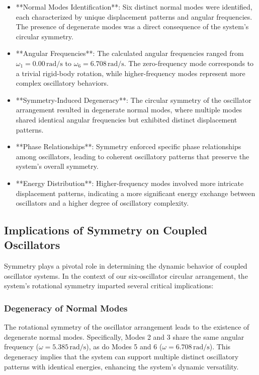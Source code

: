 \documentclass[12pt]{report} %
\begin{document}
\begin{itemize}
    \item **Normal Modes Identification**: Six distinct normal modes were identified, each characterized by unique displacement patterns and angular frequencies. The presence of degenerate modes was a direct consequence of the system's circular symmetry.
    
    \item **Angular Frequencies**: The calculated angular frequencies ranged from \( \omega_1 = 0.00 \, \text{rad/s} \) to \( \omega_6 = 6.708 \, \text{rad/s} \). The zero-frequency mode corresponds to a trivial rigid-body rotation, while higher-frequency modes represent more complex oscillatory behaviors.
    
    \item **Symmetry-Induced Degeneracy**: The circular symmetry of the oscillator arrangement resulted in degenerate normal modes, where multiple modes shared identical angular frequencies but exhibited distinct displacement patterns.
    
    \item **Phase Relationships**: Symmetry enforced specific phase relationships among oscillators, leading to coherent oscillatory patterns that preserve the system's overall symmetry.
    
    \item **Energy Distribution**: Higher-frequency modes involved more intricate displacement patterns, indicating a more significant energy exchange between oscillators and a higher degree of oscillatory complexity.
\end{itemize}

\subsection{Implications of Symmetry on Coupled Oscillators}
\label{subsec:part5_symmetry_implications}

Symmetry plays a pivotal role in determining the dynamic behavior of coupled oscillator systems. In the context of our six-oscillator circular arrangement, the system's rotational symmetry imparted several critical implications:

\subsubsection{Degeneracy of Normal Modes}
\label{subsubsec:part5_degeneracy}

The rotational symmetry of the oscillator arrangement leads to the existence of degenerate normal modes. Specifically, Modes 2 and 3 share the same angular frequency (\( \omega = 5.385 \, \text{rad/s} \)), as do Modes 5 and 6 (\( \omega = 6.708 \, \text{rad/s} \)). This degeneracy implies that the system can support multiple distinct oscillatory patterns with identical energies, enhancing the system's dynamic versatility.
\end{document}
